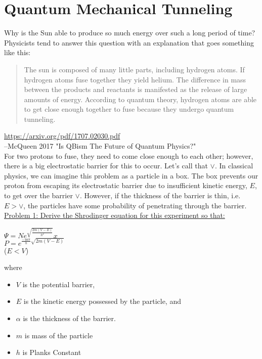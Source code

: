 \documentclass[]{article}
\date{}
\begin{document}
\section*{Quantum Mechanical Tunneling}
Why is the Sun able to produce so much energy over such a long period of time? Physicists tend to answer this question with an explanation that goes something like this:

\begin{quote} The sun is composed of many little parts, including hydrogen atoms. If hydrogen atoms fuse together they yield helium. The difference in mass between the products and reactants is manifested as the release of large amounts of energy. According to quantum theory, hydrogen atoms are able to get close enough together to fuse because they undergo quantum tunneling.
\end{quote}
{\small\url{https://arxiv.org/pdf/1707.02030.pdf}\\
--McQueen 2017 "Is QBism The Future of Quantum Physics?"}\\

For two protons to fuse, they need to come close enough to each other; however, there is a big electrostatic barrier for this to occur. Let's call that $\vee$. In classical physics, we can imagine this problem as a particle in a box. The box prevents our proton from escaping its electrostatic barrier due to insufficient kinetic energy, $E$, to get over the barrier $\vee$. However, if the thickness of the barrier is thin, i.e. $E > \vee$, the particles have some probability of penetrating through the barrier.\\

\underline{Problem 1: Derive the Shrodinger equation for this experiment so that:}
\medskip
{\centering
  
  $\Psi = Ne^{\sqrt{\frac{2m(V-E)}{h^{2}}}}x$\\
  \vspace{5mm}
  $P = e^{\frac{-4a\pi}{h}\sqrt{2m(V-E)}}$\\
  \vspace{5mm}
  ($E<V$)
  \par
}

where
\begin{itemize}
\item $V$ is the potential barrier,
\item $E$ is the kinetic energy possessed by the particle, and
\item $\alpha$ is the thickness of the barrier.
\item $m$ is mass of the particle
\item $h$ is Planks Constant\\
\end{itemize}
\end{document}

